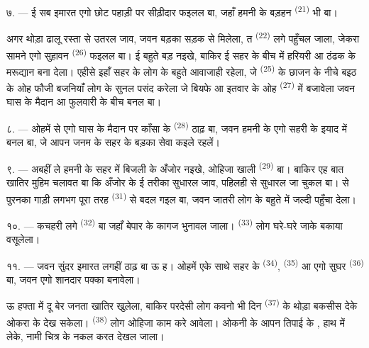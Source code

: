 ७. --- ई सब इमारत एगो छोट पहाड़ी पर सीढ़ीदार फइलल बा, जहाँ हमनी के
बड़हन  \textsuperscript{(21)} भी बा।

अगर थोड़ा ढालू रस्ता से उतरल जाव, जवन बड़का सड़क से मिलेला, त
 \textsuperscript{(22)} लगे पहुँचल जाला, जेकरा सामने एगो
सुहावन  \textsuperscript{(26)} फइलल बा। ई
 बहुते बड़ नइखे, बाकिर ई सहर के बीच में हरियरी आ
ठंढक के मरूद्यान बना देला। एहीसे इहाँ सहर के लोग के बहुते आवाजाही
रहेला, जे  \textsuperscript{(25)} के छाजन के नीचे बइठ के
ओह फौजी बजनियाँ लोग के सुनल पसंद करेला जे बियफे आ इतवार के ओह
 \textsuperscript{(27)} में बजावेला जवन घास के मैदान आ
फुलवारी के बीच बनल बा।

८. --- ओहमें से एगो घास के मैदान पर काँसा के 
\textsuperscript{(28)} ठाढ़ बा, जवन हमनी के एगो सहरी के इयाद में बनल बा,
जे आपन जनम के सहर के बड़का सेवा कइले रहलें।

\VUsaut{4.0mm}
\VUsaut{3.4mm}

९. --- अबहीं ले हमनी के सहर में बिजली के अँजोर नइखे, ओहिजा खाली
 \textsuperscript{(29)} बा। बाकिर  एह बात खातिर मुहिम चलावत बा कि अँजोर के ई तरीका सुधारल जाव,
  पहिलही से सुधारल जा
चुकल बा।  से   पुरनका गाड़ी लगभग
पूरा तरह  \textsuperscript{(31)} से बदल गइल बा,
जवन जातरी लोग के  बहुते 
में जल्दी पहुँचा देला।

१०. --- कचहरी लगे  \textsuperscript{(32)} बा जहाँ बेपार के
कागज भुनावल जाला।  \textsuperscript{(33)} लोग घरे-घरे
जाके बकाया वसूलेला।

\VUsaut{4.0mm}
\VUsaut{3.4mm}

११. --- जवन सुंदर इमारत लगहीं ठाढ़ बा ऊ  ह। ओहमें एके
साथे सहर के  \textsuperscript{(34)},  \textsuperscript{(35)} आ एगो सुघर 
\textsuperscript{(36)} बा, जवन एगो शानदार पक्का 
बनावेला।

ऊ हफ्ता में दू बेर जनता खातिर खुलेला, बाकिर परदेसी लोग कवनो भी दिन
 \textsuperscript{(37)} के थोड़ा बकसीस देके ओकरा के देख सकेला।
 \textsuperscript{(38)} लोग ओहिजा काम करे आवेला। ओकनी के
आपन तिपाई के , हाथ में  लेके, नामी चित्र
के नकल करत देखल जाला।


